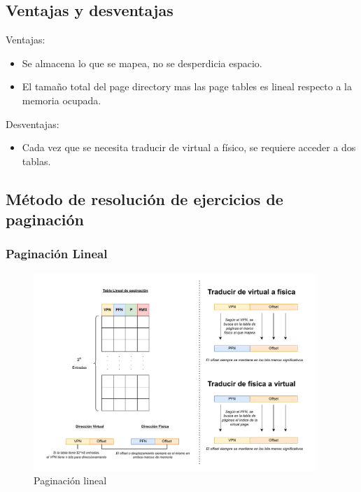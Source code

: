 \documentclass{article}
\begin{document}
\subsection{Ventajas y desventajas}
Ventajas:
\begin{itemize}
    \item Se almacena lo que se mapea, no se desperdicia espacio.
    \item El tamaño total del page directory mas las page tables es lineal respecto a la memoria ocupada.
\end{itemize}
Desventajas:
\begin{itemize}
    \item Cada vez que se necesita traducir de virtual a físico, se requiere acceder a dos tablas.
\end{itemize}

\newpage
\subsection{Método de resolución de ejercicios de paginación}
\subsubsection{Paginación Lineal}

\begin{figure}[h]
    \centering
    \includegraphics[width=0.95\textwidth]{src/paglineal.pdf}
    \caption{Paginación lineal}
\end{figure}
\end{document}
